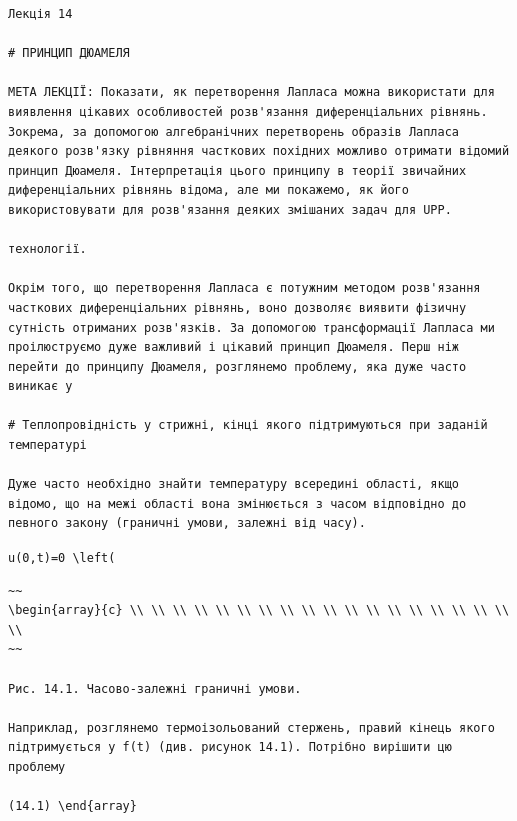 \documentclass[
  ukrainian,
]{article}
\begin{document}
\begin{verbatim}
Лекція 14

# ПРИНЦИП ДЮАМЕЛЯ

МЕТА ЛЕКЦІЇ: Показати, як перетворення Лапласа можна використати для виявлення цікавих особливостей розв'язання диференціальних рівнянь. Зокрема, за допомогою алгебранічних перетворень образів Лапласа деякого розв'язку рівняння часткових похідних можливо отримати відомий принцип Дюамеля. Інтерпретація цього принципу в теорії звичайних диференціальних рівнянь відома, але ми покажемо, як його використовувати для розв'язання деяких змішаних задач для UPP.

технології.

Окрім того, що перетворення Лапласа є потужним методом розв'язання часткових диференціальних рівнянь, воно дозволяє виявити фізичну сутність отриманих розв'язків. За допомогою трансформації Лапласа ми проілюструємо дуже важливий і цікавий принцип Дюамеля. Перш ніж перейти до принципу Дюамеля, розглянемо проблему, яка дуже часто виникає у

# Теплопровідність у стрижні, кінці якого підтримуються при заданій температурі

Дуже часто необхідно знайти температуру всередині області, якщо відомо, що на межі області вона змінюється з часом відповідно до певного закону (граничні умови, залежні від часу).
\end{verbatim}

\texttt{u(0,t)=0\ \textbackslash{}left(}

\begin{verbatim}
~~
\begin{array}{c} \\ \\ \\ \\ \\ \\ \\ \\ \\ \\ \\ \\ \\ \\ \\ \\ \\ \\ \\
~~

Рис. 14.1. Часово-залежні граничні умови.

Наприклад, розглянемо термоізольований стержень, правий кінець якого підтримується у f(t) (див. рисунок 14.1). Потрібно вирішити цю проблему

(14.1) \end{array}
\end{verbatim}
\end{document}
